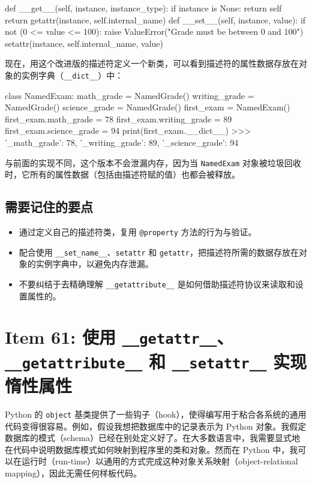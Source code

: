 \begin{codebox}[python]
    def __get__(self, instance, instance_type):
        if instance is None:
            return self
        return getattr(instance, self.internal_name)
    def __set__(self, instance, value):
        if not (0 <= value <= 100):
            raise ValueError("Grade must be between 0 and 100")
        setattr(instance, self.internal_name, value)
\end{codebox}

现在，用这个改进版的描述符定义一个新类，可以看到描述符的属性数据存放在对象的实例字典（\texttt{\_\_dict\_\_}）中：

\begin{codebox}[python]
class NamedExam:
    math_grade = NamedGrade()
    writing_grade = NamedGrade()
    science_grade = NamedGrade()
first_exam = NamedExam()
first_exam.math_grade = 78
first_exam.writing_grade = 89
first_exam.science_grade = 94
print(first_exam.__dict__)
>>>
{'_math_grade': 78, '_writing_grade': 89, '_science_grade': 94}
\end{codebox}

与前面的实现不同，这个版本不会泄漏内存，因为当 \texttt{NamedExam} 对象被垃圾回收时，它所有的属性数据（包括由描述符赋的值）也都会被释放。

\subsection{需要记住的要点}

\begin{itemize}
\item 通过定义自己的描述符类，复用 \texttt{@property} 方法的行为与验证。
\item 配合使用 \texttt{\_\_set\_name\_\_}、\texttt{setattr} 和 \texttt{getattr}，把描述符所需的数据存放在对象的实例字典中，以避免内存泄漏。
\item 不要纠结于去精确理解 \texttt{\_\_getattribute\_\_} 是如何借助描述符协议来读取和设置属性的。
\end{itemize}

\section{Item 61: 使用 \texttt{\_\_getattr\_\_}、\texttt{\_\_getattribute\_\_} 和 \texttt{\_\_setattr\_\_} 实现惰性属性}

Python 的 \texttt{object} 基类提供了一些钩子（hook），使得编写用于粘合各系统的通用代码变得很容易。例如，假设我想把数据库中的记录表示为 Python 对象。我假定数据库的模式（schema）已经在别处定义好了。在大多数语言中，我需要显式地在代码中说明数据库模式如何映射到程序里的类和对象。然而在 Python 中，我可以在运行时（run-time）以通用的方式完成这种对象关系映射（object-relational mapping），因此无需任何样板代码。

